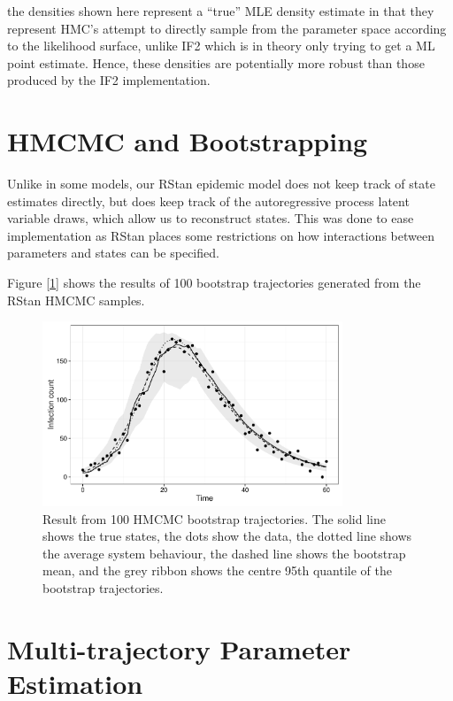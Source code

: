     the densities shown here represent a ``true'' MLE density estimate in that they represent HMC's attempt to directly sample from the parameter space according to the likelihood surface, unlike IF2 which is in theory only trying to get a ML point estimate. Hence, these densities are potentially more robust than those produced by the IF2 implementation.


\section{HMCMC and Bootstrapping}

	Unlike in some models, our RStan epidemic model does not keep track of state estimates directly, but does keep track of the autoregressive process latent variable draws, which allow us to reconstruct states. This was done to ease implementation as RStan places some restrictions on how interactions between parameters and states can be specified.

	Figure [\ref{hmcboot}] shows the results of 100 bootstrap trajectories generated from the RStan HMCMC samples.

	\begin{figure}
        \centering
        \captionsetup{width=.8\linewidth}
        \includegraphics[width=0.8\textwidth]{./images/hmcboot.pdf}
        \caption{Result from 100 HMCMC bootstrap trajectories. The solid line shows the true states, the dots show the data, the dotted line shows the average system behaviour, the dashed line shows the bootstrap mean, and the grey ribbon shows the centre 95th quantile of the bootstrap trajectories. \label{hmcboot}}
    \end{figure}


\section{Multi-trajectory Parameter Estimation}

